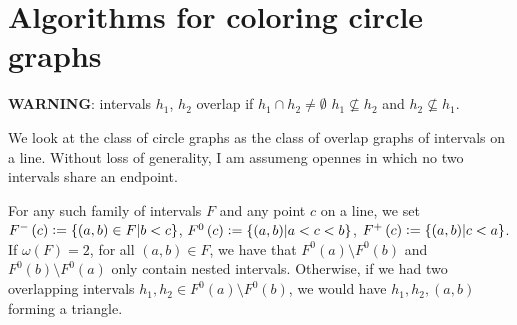\documentclass[12pt]{article}
\theoremstyle{definition}
\newcommand{\defeq}{\vcentcolon=}
\begin{document}
    \section{Algorithms for coloring circle graphs}
    
    \textbf{WARNING}: intervals
    $h_1$, $h_2$ overlap if
    $h_1 \cap h_2 \neq \emptyset$
    $h_1 \not \subseteq h_2$ and
    $h_2 \not \subseteq h_1$.
    \vspace{4pt}

    We look at the class
    of circle graphs as the class
    of overlap graphs of intervals on a line.
    Without loss of generality,
    {I am assumeng opennes}
    in which no two intervals
    share an endpoint.

    For any such family of intervals
    $F$ and any point $c$ on a line,
    we set $F^{-}\left(c\right) \defeq
    \left\{\left(a, b\right) \in F
    \middle| b < c\right\}$,
    $F^{0}\left(c\right) \defeq
    \left\{\left(a, b\right)
    \middle| a < c < b\right\}$,
    $F^{+}\left(c\right) \defeq
    \left\{\left(a, b\right)
    \middle| c < a\right\}$.
    If $\omega\left(F\right) = 2$,
    for all $\left(a, b\right) \in F$,
    we have that
    $F^{0}\left(a\right) \setminus F^{0}\left(b\right)$ 
    and $F^{0}\left(b\right) \setminus F^{0}\left(a\right)$
    only contain nested intervals.
    Otherwise, if we had two
    overlapping intervals $h_1, h_2 \in
    F^{0}\left(a\right) \setminus F^{0}\left(b\right)$,
    we would have $h_1, h_2, \left(a, b\right)$ 
    forming a triangle.
\end{document}

